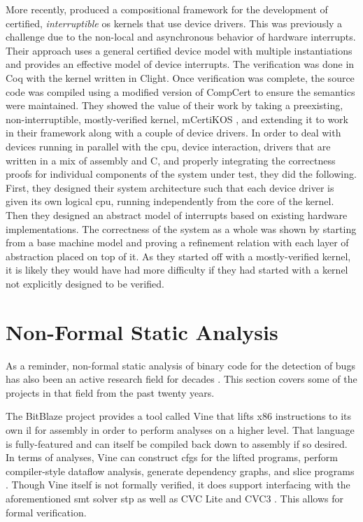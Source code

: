 More recently, \textcite{chen2018compositional} produced a compositional framework
for the development of certified, \emph{interruptible}%
\ac{os} kernels that use device drivers.%
This was previously a challenge due to the non-local and asynchronous behavior
of hardware interrupts. Their approach uses a general certified device model
with multiple instantiations and provides an effective model of device interrupts.
The verification was done in Coq with the kernel written in Clight.
Once verification was complete, the source code was compiled using a modified version
of CompCert to ensure the semantics were maintained.
They showed the value of their work by taking a preexisting,
non-interruptible, mostly-verified kernel, mCertiKOS \autocite{costanzo2016endtoend},
and extending it to work in their framework along with a couple of device drivers.
In order to deal with devices running in parallel with the \ac{cpu},
device interaction, drivers that are written in a mix of assembly and C,
and properly integrating the correctness proofs for individual components
of the system under test, they did the following.
First, they designed their system architecture such that each device driver
is given its own logical \ac{cpu}, running independently from the core of the kernel.
Then they designed an abstract model of interrupts
based on existing hardware implementations.
The correctness of the system as a whole was shown
by starting from a base machine model
and proving a refinement relation with each layer of abstraction placed on top of it.
As they started off with a mostly-verified kernel, it is likely they would have had
more difficulty if they had started with a kernel
not explicitly designed to be verified.

\section{Non-Formal Static Analysis}\label{se:static_analysis}
As a reminder, non-formal static analysis of binary code for the detection of bugs has also been an active research field for decades \autocite{kruegel2005automating,brumley2011bap,wang2017angr}.
This section covers some of the projects in that field from the past twenty years.

The BitBlaze project \autocite{song2008bitblaze,BitBlazeWebSite}
provides a tool called Vine that lifts \gls{x86} instructions to its own \ac{il} for assembly
in order to perform analyses on a higher level.
That language is fully-featured and can itself be compiled back down to assembly
if so desired.
In terms of analyses, Vine can construct \acp{cfg} for the lifted programs,
perform compiler-style dataflow analysis, generate dependency graphs,
and slice programs \autocite{weiser1981slicing,tip1995survey}.
Though Vine itself is not formally verified,
it does support interfacing with the aforementioned \ac{smt} solver \ac{stp}
as well as CVC Lite \autocite{barrett2004cvcl} and CVC3 \autocite{barrett2007cvc3}.
This allows for formal verification.

